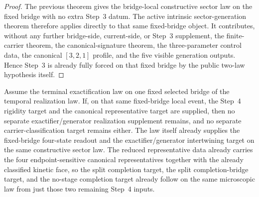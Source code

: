 \begin{proof}
The previous theorem gives the bridge-local constructive sector law on the fixed
bridge with no extra Step~3 datum. The active intrinsic sector-generation
theorem therefore applies directly to that same fixed-bridge object. It
contributes, without any further bridge-side, current-side, or Step~3
supplement, the finite-carrier theorem, the canonical-signature theorem, the
three-parameter control data, the canonical \([3,2,1]\) profile, and the
five visible generation outputs. Hence Step~3 is already fully forced on that
fixed bridge by the public two-law hypothesis itself.
\end{proof}

\begin{theorem}
\label{thm:terminal-exactification-removes-the-four-state-exactifier-seam}
Assume the terminal exactification law on one fixed selected bridge of the
temporal realization law. If, on that same fixed-bridge local event, the
Step~4 rigidity target and the canonical representative target are
supplied, then no separate exactifier/generator realization supplement
remains, and no separate carrier-classification target remains either. The law
itself already supplies the fixed-bridge four-state readout and the
exactifier/generator intertwining target on the same constructive sector law.
The reduced representative data already carries the four endpoint-sensitive
canonical representatives together with the already classified kinetic face, so
the split completion target, the split completion-bridge target, and the
no-stage completion target already follow on the same microscopic law from just
those two remaining Step~4 inputs.
\end{theorem}

